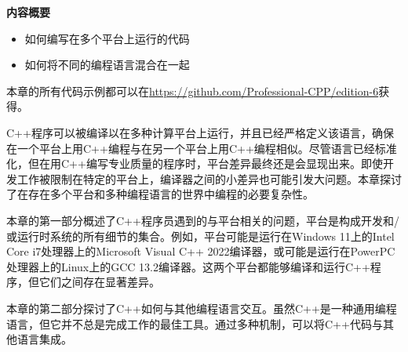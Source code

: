 \noindent
\textbf{内容概要}

\begin{itemize}
\item
如何编写在多个平台上运行的代码

\item
如何将不同的编程语言混合在一起
\end{itemize}

本章的所有代码示例都可以在\url{https://github.com/Professional-CPP/edition-6}获得。

C++程序可以被编译以在多种计算平台上运行，并且已经严格定义该语言，确保在一个平台上用C++编程与在另一个平台上用C++编程相似。尽管语言已经标准化，但在用C++编写专业质量的程序时，平台差异最终还是会显现出来。即使开发工作被限制在特定的平台上，编译器之间的小差异也可能引发大问题。本章探讨了在存在多个平台和多种编程语言的世界中编程的必要复杂性。

本章的第一部分概述了C++程序员遇到的与平台相关的问题，平台是构成开发和/或运行时系统的所有细节的集合。例如，平台可能是运行在Windows 11上的Intel Core i7处理器上的Microsoft Visual C++ 2022编译器，或可能是运行在PowerPC处理器上的Linux上的GCC 13.2编译器。这两个平台都能够编译和运行C++程序，但它们之间存在显著差异。

本章的第二部分探讨了C++如何与其他编程语言交互。虽然C++是一种通用编程语言，但它并不总是完成工作的最佳工具。通过多种机制，可以将C++代码与其他语言集成。


